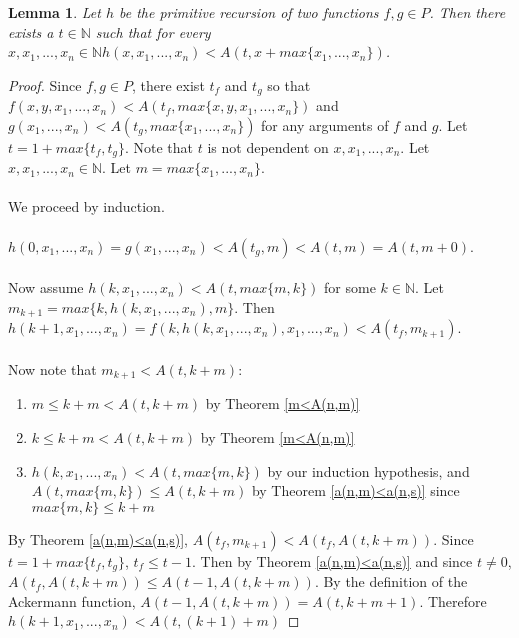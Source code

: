 \documentclass[12pt, letterpaper]{article}
\newtheorem{lemma}{Lemma}
\theoremstyle{case}
\begin{document}
    \begin{lemma}
      \label{recursionlemma}
      Let $h$ be the primitive recursion of two functions $f, g \in P$.
      Then there exists a $t \in \mathbb{N}$ such that
      for every $x, x_1, ..., x_n \in \mathbb{N}
      h(x, x_1, ..., x_n) < A(t, x + max\{x_1, ..., x_n\})$.
    \end{lemma}
    \begin{proof}
      Since $f, g \in P$, there exist $t_f$ and $t_g$ so that 
      $f(x, y, x_1, ..., x_n) < A(t_f, max\{x, y, x_1, ..., x_n\})$ and
      $g(x_1, ..., x_n) < A(t_g, max\{x_1, ..., x_n\})$ for any arguments of $f$ and $g$.
      Let $t = 1 + max\{t_f, t_g\}$. Note that $t$ is not dependent on $x, x_1, ..., x_n$.
      Let $x, x_1, ..., x_n \in \mathbb{N}$.
      Let $m = max\{x_1, ..., x_n\}$.
      \\
      \\
      We proceed by induction.
      \\
      \\
      $h(0, x_1, ..., x_n) = g(x_1, ..., x_n) < A(t_g, m) < A(t, m) = A(t, m + 0)$.
      \\
      \\
      Now assume $h(k, x_1, ..., x_n) < A(t, max\{m, k\})$ for some $k \in \mathbb{N}$.
      Let $m_{k+1} = max\{k, h(k, x_1, ..., x_n), m\}$.
      Then $h(k + 1, x_1, ..., x_n) = f(k, h(k, x_1, ..., x_n), x_1, ..., x_n) < A(t_f, m_{k+1})$.
      \\
      \\
      Now note that $m_{k+1} < A(t, k + m)$:
      \begin{enumerate}
        \item $m \leq k + m < A(t, k + m)$ by Theorem \ref{m<A(n,m)}
        \item $k \leq k + m < A(t, k + m)$ by Theorem \ref{m<A(n,m)}
        \item $h(k, x_1, ..., x_n) < A(t, max\{m, k\})$ by our induction hypothesis, and $A(t, max\{m, k\}) \leq
        A(t, k + m)$ by Theorem \ref{a(n,m)<a(n,s)} since $max\{m, k\} \leq k + m$
      \end{enumerate}
      By Theorem \ref{a(n,m)<a(n,s)}, $A(t_f, m_{k+1}) < A(t_f, A(t, k + m))$.
      Since $t = 1 + max\{t_f, t_g\}$, $t_f \leq t - 1$.
      Then by Theorem \ref{a(n,m)<a(n,s)} and since $t \neq 0$, $A(t_f, A(t, k + m)) \leq A(t - 1, A(t, k + m))$.
      By the definition of the Ackermann function, $A(t - 1, A(t, k + m)) = A(t, k + m + 1)$.
      Therefore $h(k + 1, x_1, ..., x_n) < A(t, (k + 1) + m)$
    \end{proof}
\end{document}
